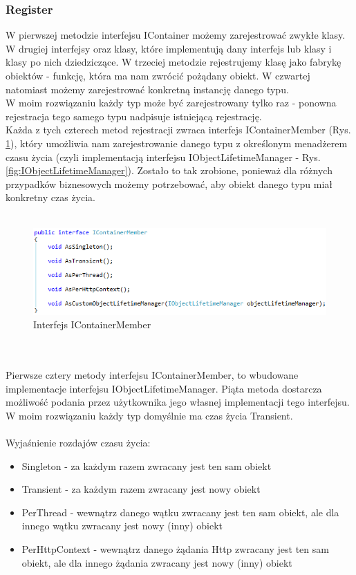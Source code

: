 \documentclass[12pt]{article}
\begin{document}
\subsubsection{Register}
W pierwszej metodzie interfejsu IContainer możemy zarejestrować zwykłe klasy. W drugiej interfejsy oraz klasy, które implementują dany interfejs lub klasy i klasy po nich dziedziczące. W trzeciej metodzie rejestrujemy klasę jako fabrykę obiektów - funkcję, która ma nam zwrócić pożądany obiekt. W czwartej natomiast możemy zarejestrować konkretną instancję danego typu.\\
W moim rozwiązaniu każdy typ może być zarejestrowany tylko raz - ponowna rejestracja tego samego typu nadpisuje istniejącą rejestrację.\\
Każda z tych czterech metod rejestracji zwraca interfejs IContainerMember (Rys. \ref{fig:IContainerMember}), który umożliwia nam zarejestrowanie danego typu z określonym menadżerem czasu życia (czyli implementacją interfejsu IObjectLifetimeManager - Rys. \ref{fig:IObjectLifetimeManager}). Zostało to tak zrobione, ponieważ dla różnych przypadków biznesowych możemy potrzebować, aby obiekt danego typu miał konkretny czas życia.\\ \\
\begin{figure}[h]
	\begin{center}
  		\includegraphics{IContainerMember.png}
  		\caption{Interfejs IContainerMember}
  		\label{fig:IContainerMember}
	\end{center}
\end{figure}\\ \\
Pierwsze cztery metody interfejsu IContainerMember, to wbudowane implementacje interfejsu IObjectLifetimeManager. Piąta metoda dostarcza możliwość podania przez użytkownika jego własnej implementacji tego interfejsu. W moim rozwiązaniu każdy typ domyślnie ma czas życia Transient.\\
\\
Wyjaśnienie rozdajów czasu życia:
\begin{itemize}
	\item Singleton - za każdym razem zwracany jest ten sam obiekt
	\item Transient - za każdym razem zwracany jest nowy obiekt
	\item PerThread - wewnątrz danego wątku zwracany jest ten sam obiekt, ale dla innego wątku zwracany jest nowy (inny) obiekt
	\item PerHttpContext - wewnątrz danego żądania Http zwracany jest ten sam obiekt, ale dla innego żądania zwracany jest nowy (inny) obiekt
\end{itemize}
\end{document}
